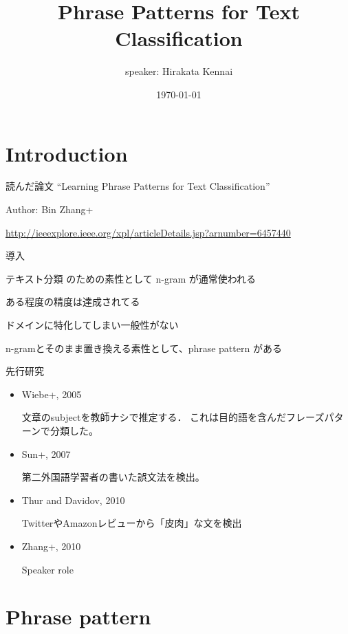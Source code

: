 \documentclass[12pt, dvipdfmx, default, cjk]{beamer}
\title{Phrase Patterns for Text Classification}
\author{speaker: Hirakata Kennai}
\institute[CS]{Univ. of Tokyo, CS}
\date{\today}
\begin{document}
\begin{frame} \titlepage \end{frame}
\begin{frame} \tableofcontents \end{frame}

\section{Introduction}

\begin{frame}{読んだ論文}
  ``Learning Phrase Patterns for Text Classification''

  Author: Bin Zhang+

  \url{http://ieeexplore.ieee.org/xpl/articleDetails.jsp?arnumber=6457440}
\end{frame}

\begin{frame}{導入}

テキスト分類
のための素性として
n-gram
が通常使われる

ある程度の精度は達成されてる

ドメインに特化してしまい一般性がない

n-gramとそのまま置き換える素性として、phrase pattern がある
\end{frame}

\begin{frame}{先行研究}
  \begin{itemize}
    \item Wiebe+, 2005

      文章のsubjectを教師ナシで推定する．
      これは目的語を含んだフレーズパターンで分類した。

    \item Sun+, 2007

      第二外国語学習者の書いた誤文法を検出。

    \item Thur and Davidov, 2010

      TwitterやAmazonレビューから「皮肉」な文を検出

    \item Zhang+, 2010

      Speaker role
  \end{itemize}
\end{frame}

\section{Phrase pattern}
\end{document}
